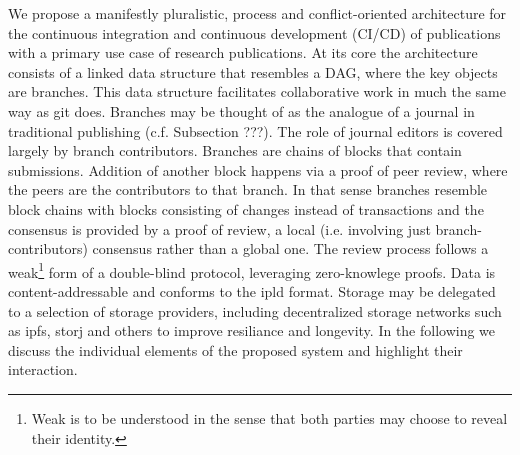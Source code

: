 \documentclass[14pt]{article}
\begin{document}
% 
% 
% 
% 
 


We propose a manifestly pluralistic, process and conflict-oriented architecture for the continuous integration and continuous development (CI/CD) of publications with a primary use case of research publications. At its core the architecture consists of a linked data structure that resembles a DAG, where the key objects are branches. This data structure facilitates collaborative work in much the same way as git does. Branches may be thought of as the analogue of a journal in traditional publishing (c.f. Subsection ???). The role of journal editors is covered largely by branch contributors. Branches are chains of blocks that contain submissions. Addition of another block happens via a proof of peer review, where the peers are the contributors to that branch. In that sense branches resemble block chains with blocks consisting of changes instead of transactions and the consensus is provided by a  proof of review, a local (i.e. involving just branch-contributors) consensus rather than a global one.
The review process follows a weak\footnote{Weak is to be understood in the sense that both parties may choose to reveal their identity.} form of a double-blind protocol, leveraging zero-knowlege proofs.
Data is content-addressable and conforms to the ipld format. Storage may be delegated to a selection of storage providers, including decentralized storage networks such as ipfs, storj and others to improve resiliance and longevity. In the following we discuss the individual elements of the proposed system and highlight their interaction.
\end{document}
